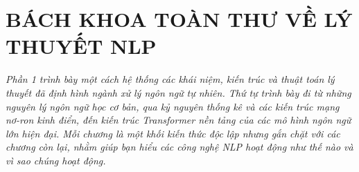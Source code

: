 \part{BÁCH KHOA TOÀN THƯ VỀ LÝ THUYẾT NLP}

\textit{Phần 1 trình bày một cách hệ thống các khái niệm, kiến trúc và thuật toán lý thuyết đã định hình ngành xử lý ngôn ngữ tự nhiên. Thứ tự trình bày đi từ những nguyên lý ngôn ngữ học cơ bản, qua kỷ nguyên thống kê và các kiến trúc mạng nơ-ron kinh điển, đến kiến trúc Transformer nền tảng của các mô hình ngôn ngữ lớn hiện đại. Mỗi chương là một khối kiến thức độc lập nhưng gắn chặt với các chương còn lại, nhằm giúp bạn hiểu các công nghệ NLP hoạt động như thế nào và vì sao chúng hoạt động.}